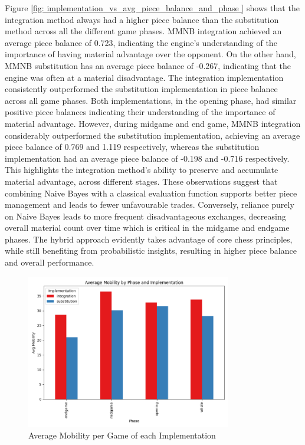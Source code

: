 Figure \ref{fig: implementation_vs_avg_piece_balance_and_phase } shows that the integration method always had a higher piece balance than the substitution method across all the different game phases. MMNB integration achieved an average piece balance of 0.723, indicating the engine's understanding of the importance of having material advantage over the opponent. On the other hand, MMNB substitution has an average piece balance of -0.267, indicating that the engine was often at a material disadvantage. The integration implementation consistently outperformed the substitution implementation in piece balance across all game phases. Both implementations, in the opening phase, had similar positive piece balances indicating their understanding of the importance of material advantage. However, during midgame and end game, MMNB integration considerably outperformed the substitution implementation, achieving an average piece balance of 0.769 and 1.119 respectively, whereas the substitution implementation had an average piece balance of -0.198 and -0.716 respectively. This highlights the integration method's ability to preserve and accumulate material advantage, across different stages. These observations suggest that combining Naive Bayes with a classical evaluation function supports better piece management and leads to fewer unfavourable trades. Conversely, reliance purely on Naive Bayes 
leads to more frequent disadvantageous exchanges, decreasing overall material count over time which is critical in the midgame and endgame phases. The hybrid approach evidently takes 
advantage of core chess principles, while still benefiting from probabilistic insights, resulting in higher piece balance and overall performance.

\begin{figure}[H]
    \centering
    \includegraphics[width=0.8\textwidth]{images/plots/implementation/Implementation_vs_avg_mobility_and_phase.png}
    \caption{Average Mobility per Game of each Implementation}
    \label{fig: implementation_vs_avg_mobility_and_phase}
\end{figure}


